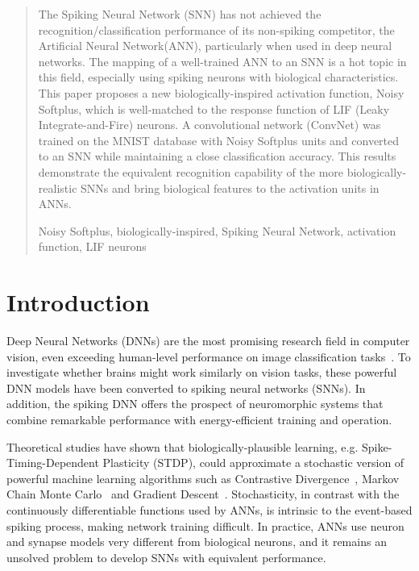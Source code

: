 \documentclass[runningheads,a4paper]{llncs}
\newcommand{\keywords}[1]{\par\addvspace\baselineskip
	\noindent\keywordname\enspace\ignorespaces#1}
\begin{document}
	
	\begin{abstract}
		The Spiking Neural Network (SNN) has not achieved the recognition/classification performance of its non-spiking competitor, the Artificial Neural Network(ANN), particularly when used in deep neural networks.
		The mapping of a well-trained ANN to an SNN is a hot topic in this field, especially using spiking neurons with biological characteristics.
		This paper proposes a new biologically-inspired activation function, Noisy Softplus, which is well-matched to the response function of LIF (Leaky Integrate-and-Fire) neurons.
		A convolutional network (ConvNet) was trained on the MNIST database with Noisy Softplus units and converted to an SNN while maintaining a close classification accuracy.
		This results demonstrate the equivalent recognition capability of the more biologically-realistic SNNs and bring biological features to the activation units in ANNs.
		\keywords{Noisy Softplus, biologically-inspired, Spiking Neural Network, activation function, LIF neurons}
	\end{abstract}
	
	\section{Introduction}
	
	Deep Neural Networks (DNNs) are the most promising research field in computer vision, even exceeding human-level performance on image classification tasks~\cite{he2015delving}.
	To investigate whether brains might work similarly on vision tasks, these powerful DNN models have been converted to spiking neural networks (SNNs).
	In addition, the spiking DNN offers the prospect of neuromorphic systems that combine remarkable performance with energy-efficient training and operation.
	
	Theoretical studies have shown that biologically-plausible learning, e.g. Spike-Timing-Dependent Plasticity (STDP), could approximate a stochastic version of powerful machine learning algorithms
	such as 
	Contrastive Divergence~\cite{neftci2013event}, Markov Chain Monte Carlo~\cite{buesing2011neural} and Gradient Descent~\cite{o2016deep}.
	Stochasticity, in contrast with the continuously differentiable functions used by ANNs, is intrinsic to the event-based spiking process, making network training difficult.
	In practice, ANNs use neuron and synapse models very different from biological neurons, and it remains an unsolved problem to develop SNNs with equivalent performance.
	
\end{document}
